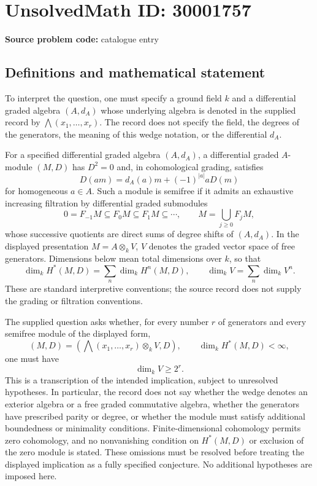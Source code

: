 \documentclass[11pt]{article}
\begin{document}
\section*{UnsolvedMath ID: 30001757}
\textbf{Source problem code:} catalogue entry
\subsection{Definitions and mathematical statement}
To interpret the question, one must specify a ground field \(k\) and a differential graded algebra \((A,d_A)\) whose underlying algebra is denoted in the supplied record by \(\bigwedge(x_1,\ldots,x_r)\). The record does not specify the field, the degrees of the generators, the meaning of this wedge notation, or the differential \(d_A\).

For a specified differential graded algebra \((A,d_A)\), a differential graded \(A\)-module \((M,D)\) has \(D^2=0\) and, in cohomological grading, satisfies
\[
D(am)=d_A(a)m+(-1)^{|a|}aD(m)
\]
for homogeneous \(a\in A\). Such a module is semifree if it admits an exhaustive increasing filtration by differential graded submodules
\[
0=F_{-1}M\subseteq F_0M\subseteq F_1M\subseteq\cdots,
\qquad M=\bigcup_{j\geq0}F_jM,
\]
whose successive quotients are direct sums of degree shifts of \((A,d_A)\). In the displayed presentation \(M=A\otimes_k V\), \(V\) denotes the graded vector space of free generators. Dimensions below mean total dimensions over \(k\), so that
\[
\dim_k H^*(M,D)=\sum_n\dim_k H^n(M,D),
\qquad
\dim_k V=\sum_n\dim_k V^n.
\]
These are standard interpretive conventions; the source record does not supply the grading or filtration conventions.

The supplied question asks whether, for every number \(r\) of generators and every semifree module of the displayed form,
\[
(M,D)=\left(\bigwedge(x_1,\ldots,x_r)\otimes_k V,D\right),
\qquad
\dim_k H^*(M,D)<\infty,
\]
one must have
\[
\dim_k V\geq 2^r.
\]
This is a transcription of the intended implication, subject to unresolved hypotheses. In particular, the record does not say whether the wedge denotes an exterior algebra or a free graded commutative algebra, whether the generators have prescribed parity or degree, or whether the module must satisfy additional boundedness or minimality conditions. Finite-dimensional cohomology permits zero cohomology, and no nonvanishing condition on \(H^*(M,D)\) or exclusion of the zero module is stated. These omissions must be resolved before treating the displayed implication as a fully specified conjecture. No additional hypotheses are imposed here.
\end{document}
